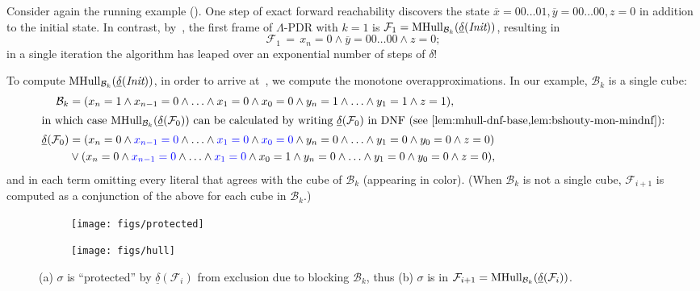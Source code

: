 \documentclass[acmsmall,screen]{acmart}
\newcommand{\ov}{\overline}
\newcommand{\Init}{{\textit{Init}}}
\newcommand{\tr}{\delta}
\newcommand{\Frame}{\mathcal{F}}
\renewcommand{\vec}{\ov}
\newcommand{\reflextr}[1]{\underline{#1}}
\newcommand{\postimage}[2]{{\reflextr{#1}}({#2})}
\newcommand{\bkwrch}[1]{\mathcal{B}_{#1}}
\newcommand{\mhull}[2]{{\rm MHull}_{#2}({#1})}
\newcommand{\litabs}[1]{\textcolor{blue}{#1}}
\begin{document}
\label{sec:overview-example-frame}
Consider again the running example ().
%
One step of exact forward reachability discovers the state $\vec{x}=00\ldots01, \vec{y}=00\ldots00, z=0$ in addition to the initial state.
In contrast, by~, the first frame of $\Lambda$-PDR with $k=1$ is $\Frame_1 = \mhull{\postimage{\tr}{\Init}}{\bkwrch{k}}$, resulting in
\begin{equation}
\label{eq:running-frame-1}
	\Frame_1 \, = \, x_n=0 \land \vec{y}=00\ldots00 \land z=0;
\end{equation}
in a single iteration the algorithm has leaped over an exponential number of steps of $\tr$!

To compute $\mhull{\postimage{\tr}{\Init}}{\bkwrch{k}}$, in order to arrive at~, we  compute the monotone overapproximations. %
In our example, $\bkwrch{k}$ is a single cube:
\begin{align*}
	\bkwrch{k} &= (x_n=1 \land x_{n-1}=0 \land \ldots \land x_1=0 \land x_0=0 \land y_n=1 \land \ldots \land y_1=1 \land z=1),
\\
\intertext{in which case $\mhull{\postimage{\tr}{\Frame_0}}{\bkwrch{k}}$ can be calculated by writing $\postimage{\tr}{\Frame_0}$ in DNF (see~\Cref{lem:mhull-dnf-base,lem:bshouty-mon-mindnf}):}
	\postimage{\tr}{\Frame_0} &=
		(x_n=0 \land \litabs{x_{n-1}=0} \land \ldots \land \litabs{x_1=0} \land \litabs{x_0=0} \land y_n=0 \land \ldots \land y_1=0 \land y_0=0 \land z=0)
		\\
		&\lor
		(x_n=0 \land \litabs{x_{n-1}=0} \land \ldots \land \litabs{x_1=0} \land x_0=1 \land y_n=0 \land \ldots \land y_1=0 \land y_0=0 \land z=0),
\end{align*}
and in each term omitting every literal that agrees with the cube of $\bkwrch{k}$ (appearing in color).
%
(When $\bkwrch{k}$ is not a single cube, $\Frame_{i+1}$ is computed as a conjunction of the above for each cube in $\bkwrch{k}$.)

\begin{figure}[t]
  \centering
  \begin{subfigure}[t]{0.35\textwidth}
    \texttt{[image: figs/protected]}
    \caption{}
    \iflong\else\vspace{-0.2cm}\fi
    \label{fig:protected-single}
  \end{subfigure}
  \hspace{0.15\textwidth}
  \begin{subfigure}[t]{0.3\textwidth}
    \texttt{[image: figs/hull]}
    \caption{}
    \iflong\else\vspace{-0.2cm}\fi
  \end{subfigure}
  \caption{(a) $\sigma$ is ``protected'' by $\postimage{\tr}{\Frame_i}$ from exclusion due to blocking $\bkwrch{k}$,
    thus (b) $\sigma$ is in $\Frame_{i+1} = \mhull{\postimage{\tr}{\Frame_i}}{\bkwrch{k}}$.
    }
  \label{fig:protected-hull}
\iflong\else\vspace{-0.45cm}\fi
\end{figure}
\end{document}

